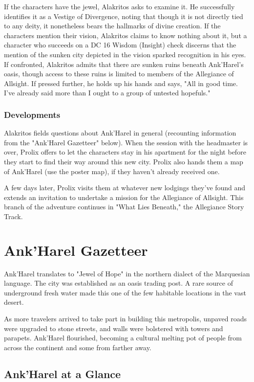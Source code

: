 \documentclass[10pt,a4paper,twoside,fancy,bg=print,twocolumn,openany,nodeprecatedcode]{dndbook}
\begin{document}
If the characters have the jewel, Alakritos asks to examine it. He successfully identifies it as a Vestige of Divergence, noting that though it is not directly tied to any deity, it nonetheless bears the hallmarks of divine creation. If the characters mention their vision, Alakritos claims to know nothing about it, but a character who succeeds on a DC 16 Wisdom (Insight) check discerns that the mention of the sunken city depicted in the vision sparked recognition in his eyes. If confronted, Alakritos admits that there are sunken ruins beneath Ank'Harel's oasis, though access to these ruins is limited to members of the Allegiance of Allsight. If pressed further, he holds up his hands and says, "All in good time. I've already said more than I ought to a group of untested hopefuls."

\subsubsection{Developments}
Alakritos fields questions about Ank'Harel in general (recounting information from the "Ank'Harel Gazetteer" below). When the session with the headmaster is over, Prolix offers to let the characters stay in his apartment for the night before they start to find their way around this new city. Prolix also hands them a map of Ank'Harel (use the poster map), if they haven't already received one.

A few days later, Prolix visits them at whatever new lodgings they've found and extends an invitation to undertake a mission for the Allegiance of Allsight. This branch of the adventure continues in "What Lies Beneath," the Allegiance Story Track.

\section{Ank'Harel Gazetteer}
Ank'Harel translates to "Jewel of Hope" in the northern dialect of the Marquesian language. The city was established as an oasis trading post. A rare source of underground fresh water made this one of the few habitable locations in the vast desert.

As more travelers arrived to take part in building this metropolis, unpaved roads were upgraded to stone streets, and walls were bolstered with towers and parapets. Ank'Harel flourished, becoming a cultural melting pot of people from across the continent and some from farther away.

\subsection{Ank'Harel at a Glance}
\end{document}
